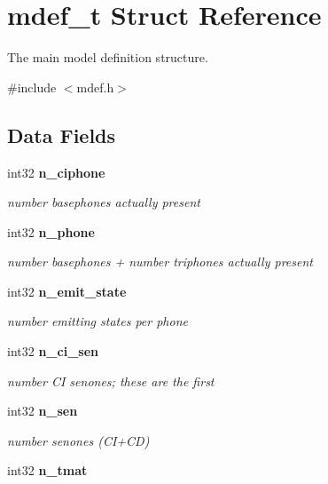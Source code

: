 \section{mdef\+\_\+t Struct Reference}
\label{structmdef__t}


The main model definition structure.  




{\ttfamily \#include $<$mdef.\+h$>$}

\subsection*{Data Fields}
\begin{DoxyCompactItemize}
\item 
int32 {\bf n\+\_\+ciphone}\label{structmdef__t_af460d8d703782cf50ed99164cee17347}

\begin{DoxyCompactList}\small\item\em number basephones actually present \end{DoxyCompactList}\item 
int32 {\bf n\+\_\+phone}\label{structmdef__t_a987f0b9bc4c951ac031f5d283960bd9f}

\begin{DoxyCompactList}\small\item\em number basephones + number triphones actually present \end{DoxyCompactList}\item 
int32 {\bf n\+\_\+emit\+\_\+state}\label{structmdef__t_a4a7ffa9d1b9a95a3bf3cca7bd955020a}

\begin{DoxyCompactList}\small\item\em number emitting states per phone \end{DoxyCompactList}\item 
int32 {\bf n\+\_\+ci\+\_\+sen}\label{structmdef__t_a68c3cc85b849363609fd5dadf412a38c}

\begin{DoxyCompactList}\small\item\em number C\+I senones; these are the first \end{DoxyCompactList}\item 
int32 {\bf n\+\_\+sen}\label{structmdef__t_a966e28ae25bd8e766dbe81549cbdcd36}

\begin{DoxyCompactList}\small\item\em number senones (C\+I+\+C\+D) \end{DoxyCompactList}\item 
int32 {\bf n\+\_\+tmat}\label{structmdef__t_a44d1d9fd99db66f1c37937e89172fed9}


\end{DoxyCompactItemize}
